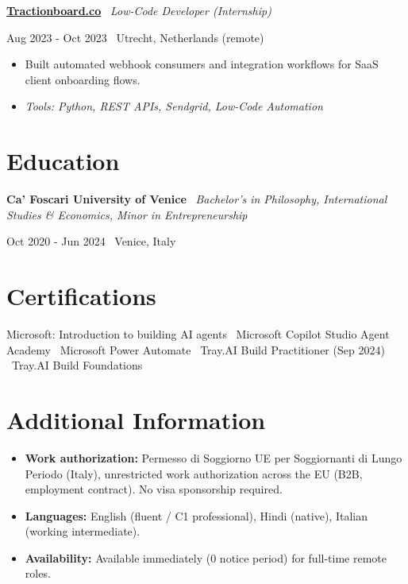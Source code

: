 \documentclass[a4paper,10pt]{article}
\newcommand{\role}[4]{%
  \vspace{2pt}\noindent
  \begin{minipage}[t]{0.70\textwidth}\raggedright\textbf{#1} \textbullet\ \textit{#3}\end{minipage}%
  \hfill
  \begin{minipage}[t]{0.28\textwidth}\raggedleft\footnotesize\color{gray}#2 \textbullet\ #4\end{minipage}%
  \vspace{1pt}%
}
\begin{document}
\role{\href{https://tractionboard.co}{Tractionboard.co}}{Aug 2023 - Oct 2023}{Low-Code Developer (Internship)}{Utrecht, Netherlands (remote)}
\begin{itemize}
  \item Built automated webhook consumers and integration workflows for SaaS client onboarding flows.
  \item \textit{Tools: Python, REST APIs, Sendgrid, Low-Code Automation}
\end{itemize}

\section{Education}
\role{Ca' Foscari University of Venice}{Oct 2020 - Jun 2024}{Bachelor's in Philosophy, International Studies \& Economics, Minor in Entrepreneurship}{Venice, Italy}

\section{Certifications}
Microsoft: Introduction to building AI agents \textbullet\ Microsoft Copilot Studio Agent Academy \textbullet\ Microsoft Power Automate \textbullet\ Tray.AI Build Practitioner (Sep 2024) \textbullet\ Tray.AI Build Foundations

\section{Additional Information}
\begin{itemize}
  \item \textbf{Work authorization:} Permesso di Soggiorno UE per Soggiornanti di Lungo Periodo (Italy), unrestricted work authorization across the EU (B2B, employment contract). No visa sponsorship required.
  \item \textbf{Languages:} English (fluent / C1 professional), Hindi (native), Italian (working intermediate).
  \item \textbf{Availability:} Available immediately (0 notice period) for full-time remote roles.
\end{itemize}

\end{document}
